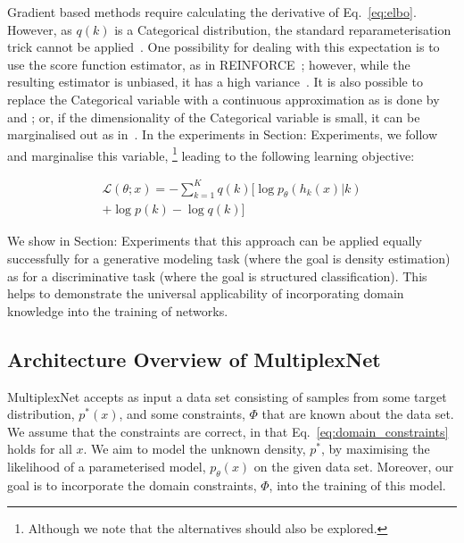\documentclass[letterpaper]{article} %
\begin{document}
Gradient based methods require calculating the derivative of Eq.~\ref{eq:elbo}.
However, as $q(k)$ is a Categorical distribution, the standard reparameterisation trick cannot be applied~\citep{kingma2013auto}.
One possibility for dealing with this expectation is to use the score function estimator, as in REINFORCE~\citep{williams1992simple}; however, while the resulting estimator is unbiased, it has a high variance~\citep{mnih2014neural}.
It is also possible to replace the Categorical variable with a continuous approximation as is done by \citet{maddison2016concrete} and \citet{jang2016categorical}; or, if the dimensionality of the Categorical variable is small, it can be marginalised out as in~\cite{kingma2014semi}.
In the experiments in Section: Experiments, we follow \citet{kingma2014semi} and marginalise this variable,%
    \footnote{Although we note that the alternatives should also be explored.}
leading to the following learning objective:

\begin{multline}
    \label{eq:learning_objective}
    \mathcal{L}(\theta; x) = -\sum\limits_{k=1}^{K} q(k)\big[ \log p_\theta(h_k(x) | k) \\ + \log p(k) - \log q(k) \big]
\end{multline}

We show in Section: Experiments that this approach can be applied equally successfully for a generative modeling task (where the goal is density estimation) as for a discriminative task (where the goal is structured classification).
This helps to demonstrate the universal applicability of incorporating domain knowledge into the training of networks.

\subsection{Architecture Overview of MultiplexNet}
\label{appendix:architecture_overview}

MultiplexNet accepts as input a data set consisting of samples from some target distribution, $p^*(x)$, and some constraints, $\Phi$ that are known about the data set.
We assume that the constraints are correct, in that Eq.~\ref{eq:domain_constraints} holds for all $x$.
We aim to model the unknown density, $p^*$, by maximising the likelihood of a parameterised model, $p_\theta(x)$ on the given data set.
Moreover, our goal is to incorporate the domain constraints, $\Phi$, into the training of this model.
\end{document}
